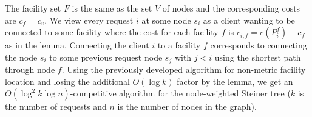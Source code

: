 The facility set $F$ is the same as the set $V$ of nodes and the corresponding costs are $c_f = c_v$. We view every request $i$ at some node $s_i$ as a client wanting to be connected to some facility where the cost for each facility $f$ is $c_{i,f} = c(P^{f}_i) - c_{f}$ as in the lemma. Connecting the client $i$ to a facility $f$ corresponds to connecting the node $s_i$ to some previous request node $s_j$ with $j<i$ using the shortest path through node $f$. Using the previously developed algorithm for non-metric facility location and losing the additional $O(\log k)$ factor by the lemma, we get an $O(\log^2 k \log n)$-competitive algorithm for the node-weighted Steiner tree ($k$ is the number of requests and $n$ is the number of nodes in the graph). 
